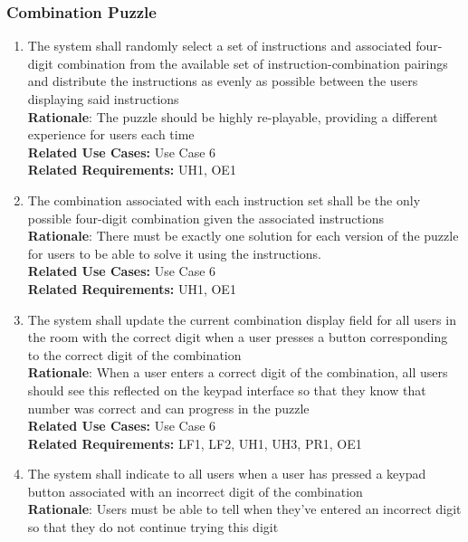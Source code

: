 \documentclass[12pt]{article}
\begin{document}
\subsubsection{Combination Puzzle}
    \begin{enumerate}[label=CP\arabic*., series=CombinationPuzzle]
        \item The system shall randomly select a set of instructions and associated four-digit combination from the available set of instruction-combination pairings and distribute the instructions as evenly as possible between the users displaying said instructions\\
        \textbf{Rationale}: The puzzle should be highly re-playable, providing a different experience for users each time\\
        \textbf{Related Use Cases:} Use Case 6\\
        \textbf{Related Requirements:} UH1, OE1
        \item The combination associated with each instruction set shall be the only possible four-digit combination given the associated instructions\\
        \textbf{Rationale}: There must be exactly one solution for each version of the puzzle for users to be able to solve it using the instructions.\\
        \textbf{Related Use Cases:} Use Case 6\\
        \textbf{Related Requirements:} UH1, OE1
        \item The system shall update the current combination display field for all users in the room with the correct digit when a user presses a button corresponding to the correct digit of the combination\\
        \textbf{Rationale}: When a user enters a correct digit of the combination, all users should see this reflected on the keypad interface so that they know that number was correct and can progress in the puzzle\\
        \textbf{Related Use Cases:} Use Case 6\\
        \textbf{Related Requirements:} LF1, LF2, UH1, UH3, PR1, OE1
        \item The system shall indicate to all users when a user has pressed a keypad button associated with an incorrect digit of the combination\\
        \textbf{Rationale}: Users must be able to tell when they've entered an incorrect digit so that they do not continue trying this digit \\

\end{enumerate}
\end{document}
